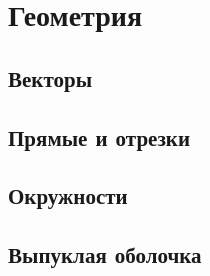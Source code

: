 \chapter{Геометрия}

\section{Векторы}

\section{Прямые и отрезки}

\section{Окружности}

\section{Выпуклая оболочка}
